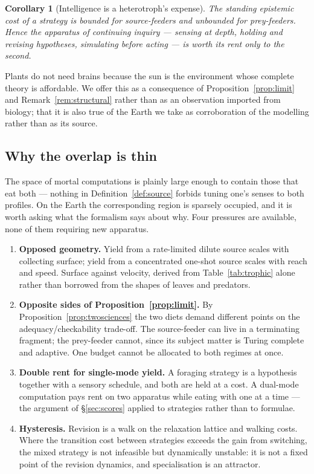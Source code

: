 \documentclass[11pt]{article}
\theoremstyle{plain}
\newtheorem{corollary}[theorem]{Corollary}
\theoremstyle{definition}
\begin{document}
\begin{corollary}[Intelligence is a heterotroph's expense]
\label{cor:intelligence}
The standing epistemic cost of a strategy is bounded for source-feeders and unbounded for prey-feeders.
Hence the apparatus of continuing inquiry --- sensing at depth, holding and revising hypotheses,
simulating before acting --- is worth its rent only to the second.
\end{corollary}

Plants do not need brains because the sun is the environment whose complete theory is affordable. We
offer this as a consequence of Proposition~\ref{prop:limit} and Remark~\ref{rem:structural} rather
than as an observation imported from biology; that it is also true of the Earth we take as
corroboration of the modelling rather than as its source.

\subsection{Why the overlap is thin}

The space of mortal computations is plainly large enough to contain those that eat both --- nothing in
Definition~\ref{def:source} forbids tuning one's senses to both profiles. On the Earth the
corresponding region is sparsely occupied, and it is worth asking what the formalism says about why.
Four pressures are available, none of them requiring new apparatus.

\begin{enumerate}
\item \textbf{Opposed geometry.} Yield from a rate-limited dilute source scales with collecting
surface; yield from a concentrated one-shot source scales with reach and speed. Surface against
velocity, derived from Table~\ref{tab:trophic} alone rather than borrowed from the shapes of leaves
and predators.

\item \textbf{Opposite sides of Proposition~\ref{prop:limit}.} By Proposition~\ref{prop:twosciences}
the two diets demand different points on the adequacy/checkability trade-off. The source-feeder can
live in a terminating fragment; the prey-feeder cannot, since its subject matter is Turing complete
and adaptive. One budget cannot be allocated to both regimes at once.

\item \textbf{Double rent for single-mode yield.} A foraging strategy is a hypothesis together with a
sensory schedule, and both are held at a cost. A dual-mode computation pays rent on two apparatus
while eating with one at a time --- the argument of \S\ref{sec:scores} applied to strategies rather
than to formulae.

\item \textbf{Hysteresis.} Revision is a walk on the relaxation lattice and walking costs. Where the
transition cost between strategies exceeds the gain from switching, the mixed strategy is not
infeasible but dynamically unstable: it is not a fixed point of the revision dynamics, and
specialisation is an attractor.
\end{enumerate}
\end{document}
